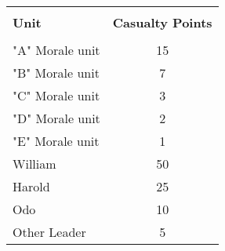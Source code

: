 \begin{tabular}{ |lc| }
  \hline &\\[-2.0ex]
  \textbf{Unit} & \textbf{Casualty Points} \\
  \hline &\\[-2.0ex]
  "A" Morale unit & 15 \\
  "B" Morale unit & 7 \\
  "C" Morale unit & 3 \\
  "D" Morale unit & 2 \\
  "E" Morale unit & 1 \\
  William & 50 \\
  Harold & 25 \\
  Odo & 10 \\
  Other Leader & 5 \\
  \hline
\end{tabular}